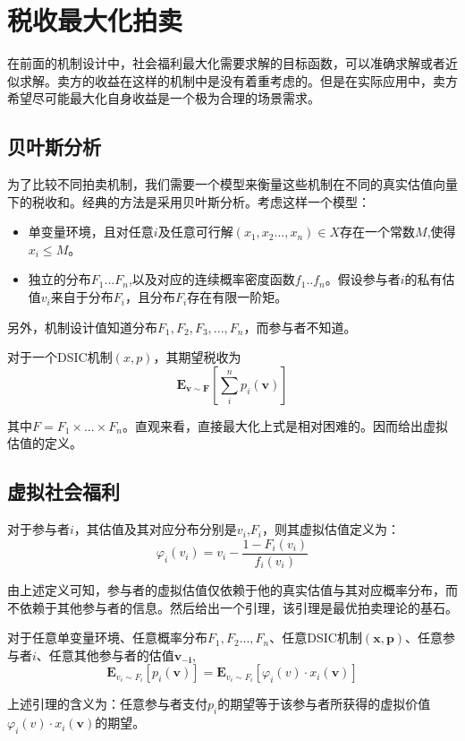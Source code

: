 \documentclass[promaster]{thesis-uestc}
\begin{document}
\section{税收最大化拍卖}
在前面的机制设计中，社会福利最大化需要求解的目标函数，可以准确求解或者近似求解。卖方的收益在这样的机制中是没有着重考虑的。但是在实际应用中，卖方希望尽可能最大化自身收益是一个极为合理的场景需求。
\subsection{贝叶斯分析}
为了比较不同拍卖机制，我们需要一个模型来衡量这些机制在不同的真实估值向量下的税收和。经典的方法是采用贝叶斯分析。考虑这样一个模型：
\begin{itemize}
    \item 单变量环境，且对任意$i$及任意可行解$(x_1,x_2...,x_n)\in X$存在一个常数$M$,使得$x_i\leq M$。
    \item 独立的分布$F_1...F_n$,以及对应的连续概率密度函数$f_1..f_n$。假设参与者$i$的私有估值$v_i$来自于分布$F_i$，且分布$F_i$存在有限一阶矩。
\end{itemize}
另外，机制设计值知道分布$F_1,F_2,F_3,...,F_n$，而参与者不知道。
\begin{definition}[期望税收]
对于一个DSIC机制$(x,p)$，其期望税收为
   \begin{equation}
    \mathbf{E}_{\mathbf{v}\sim\mathbf{F}}{\left[\sum_{i}^{n}{p_i(\mathbf{v})}\right]}
    \end{equation}
\end{definition}
其中$F=F_1\times...\times F_n$。直观来看，直接最大化上式是相对困难的。因而给出虚拟估值的定义。
\subsection{虚拟社会福利}
\begin{definition}[虚拟估值]
    对于参与者$i$，其估值及其对应分布分别是$v_i$,$F_i$，则其虚拟估值定义为：
    \begin{equation}
     \varphi_i(v_i) = v_i - \frac{1-F_i(v_i)}{f_i(v_i)}   
    \end{equation}
\end{definition}
由上述定义可知，参与者的虚拟估值仅依赖于他的真实估值与其对应概率分布，而不依赖于其他参与者的信息。然后给出一个引理，该引理是最优拍卖理论的基石。
\begin{lemma}
\label{virtualval}
    对于任意单变量环境、任意概率分布$F_1,F_2...,F_n$、任意DSIC机制$(\mathbf{x},\mathbf{p})$、任意参与者$i$、任意其他参与者的估值$\mathbf{v_{-i}}$,
    \begin{equation}
       \mathbf{E}_{v_i\sim F_i}[p_i(\mathbf{v})]= \mathbf{E}_{v_i\sim F_i}[\varphi_i(v)\cdot x_i(\mathbf{v})]
    \end{equation}
\end{lemma}
上述引理的含义为：任意参与者支付$p_i$的期望等于该参与者所获得的虚拟价值$\varphi_i(v)\cdot x_i(\mathbf{v})$的期望。
\end{document}
